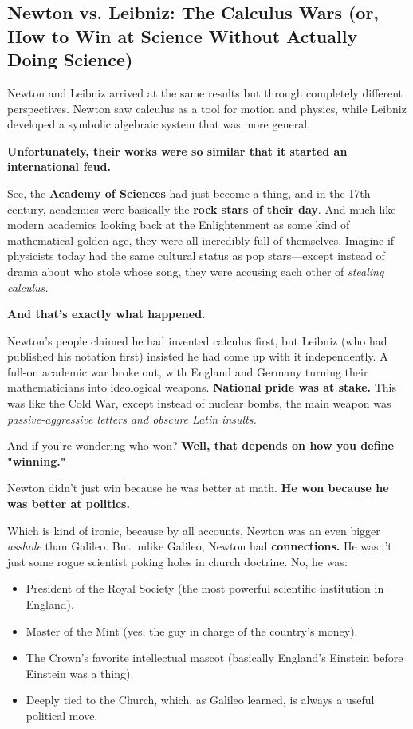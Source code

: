 \subsection{Newton vs. Leibniz: The Calculus Wars (or, How to Win at Science Without Actually Doing Science)}

Newton and Leibniz arrived at the same results but through completely different perspectives. Newton saw calculus as a tool for motion and physics, while Leibniz developed a symbolic algebraic system that was more general. 

\textbf{Unfortunately, their works were so similar that it started an international feud.} 

See, the \textbf{Academy of Sciences} had just become a thing, and in the 17th century, academics were basically the \textbf{rock stars of their day}. And much like modern academics looking back at the Enlightenment as some kind of mathematical golden age, they were all incredibly full of themselves. Imagine if physicists today had the same cultural status as pop stars—except instead of drama about who stole whose song, they were accusing each other of \textit{stealing calculus.} 

\textbf{And that’s exactly what happened.} 

Newton’s people claimed he had invented calculus first, but Leibniz (who had published his notation first) insisted he had come up with it independently. A full-on academic war broke out, with England and Germany turning their mathematicians into ideological weapons. \textbf{National pride was at stake.} This was like the Cold War, except instead of nuclear bombs, the main weapon was \textit{passive-aggressive letters and obscure Latin insults.} 

And if you’re wondering who won? \textbf{Well, that depends on how you define "winning."} 

Newton didn’t just win because he was better at math. \textbf{He won because he was better at politics.} 

Which is kind of ironic, because by all accounts, Newton was an even bigger \textit{asshole} than Galileo. But unlike Galileo, Newton had \textbf{connections.} He wasn’t just some rogue scientist poking holes in church doctrine. No, he was:  

\begin{itemize}
    \item President of the Royal Society (the most powerful scientific institution in England).  
    \item Master of the Mint (yes, the guy in charge of the country’s money).
    \item The Crown’s favorite intellectual mascot (basically England’s Einstein before Einstein was a thing).
    \item Deeply tied to the Church, which, as Galileo learned, is always a useful political move.
\end{itemize}

